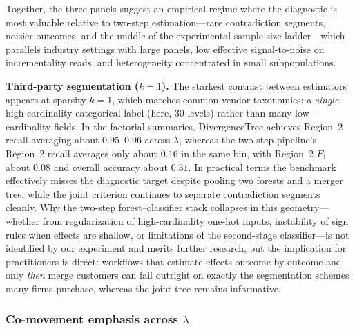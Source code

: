 \documentclass[11pt,letterpaper,english]{article}
\theoremstyle{definition}
\theoremstyle{definition}
\begin{document}
\begin{bibunit}



\vspace{6pt}
\noindent
Together, the three panels suggest an empirical regime where the diagnostic is most valuable relative to two-step estimation---rare contradiction segments, noisier outcomes, and the middle of the experimental sample-size ladder---which parallels industry settings with large panels, low effective signal-to-noise on incrementality reads, and heterogeneity concentrated in small subpopulations.

\vspace{6pt}
\noindent
\textbf{Third-party segmentation ($k{=}1$).}
The starkest contrast between estimators appears at sparsity $k{=}1$, which matches common vendor taxonomies: a \emph{single} high-cardinality categorical label (here, 30 levels) rather than many low-cardinality fields. In the factorial summaries, DivergenceTree achieves Region~2 recall averaging about $0.95$--$0.96$ across $\lambda$, whereas the two-step pipeline's Region~2 recall averages only about $0.16$ in the same bin, with Region~2 $F_1$ about $0.08$ and overall accuracy about $0.31$. In practical terms the benchmark effectively misses the diagnostic target despite pooling two forests and a merger tree, while the joint criterion continues to separate contradiction segments cleanly. Why the two-step forest--classifier stack collapses in this geometry---whether from regularization of high-cardinality one-hot inputs, instability of sign rules when effects are shallow, or limitations of the second-stage classifier---is not identified by our experiment and merits further research, but the implication for practitioners is direct: workflows that estimate effects outcome-by-outcome and only \emph{then} merge customers can fail outright on exactly the segmentation schemes many firms purchase, whereas the joint tree remains informative.

\subsubsection{Co-movement emphasis across $\lambda$}
\label{sec:results-lambda}


\end{bibunit}
\end{document}
